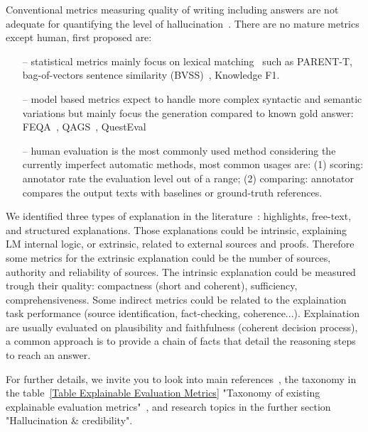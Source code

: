 \documentclass[acmsmall]{acmart}
\begin{document}
Conventional metrics measuring quality of writing including answers are not adequate for quantifying the level of hallucination~\citep{jiSurveyHallucinationNatural2022}. There are no mature metrics except human, first proposed are:
\begin{itemize}
    \item[--] statistical metrics mainly focus on lexical matching~\citep{jiSurveyHallucinationNatural2022} such as PARENT-T, bag-of-vectors sentence similarity (BVSS)~\citep{martindaleIdentifyingFluentlyInadequate2019}, Knowledge F1.
    \item[--] model based metrics expect to handle more complex syntactic and semantic variations but mainly focus the generation compared to known gold answer:  FEQA~\citep{durmusFEQAQuestionAnswering2020}, QAGS~\citep{wangAskingAnsweringQuestions2020}, QuestEval~\citep{scialomQuestEvalSummarizationAsks2021} 
    \item[--] human evaluation is the most commonly used method considering the currently imperfect automatic methods, most common usages are: (1) scoring: annotator rate the evaluation level out of a range; (2) comparing: annotator compares the output texts with baselines or ground-truth references.
\end{itemize}

We identified three types of explanation in the literature~\citep{wiegreffeTeachMeExplain2021}: highlights, free-text, and structured explanations. Those explanations could be intrinsic, explaining LM internal logic, or extrinsic, related to external sources and proofs. Therefore some metrics for the extrinsic explanation could be the number of sources, authority and reliability of sources. The intrinsic explanation could be measured trough their quality: compactness (short and coherent), sufficiency, comprehensiveness. Some indirect metrics could be related to the explaination task performance (source identification, fact-checking, coherence...). Explaination are usually evaluated on plausibility and faithfulness (coherent decision process), a common approach is to provide a chain of facts that detail the reasoning steps to reach an answer.

For further details, we invite you to look into main references~\citep{wiegreffeTeachMeExplain2021, leiterExplainableEvaluationMetrics2022, jiSurveyHallucinationNatural2022, linTruthfulQAMeasuringHow2022}, the taxonomy in the table~\ref{Table Explainable Evaluation Metrics} "Taxonomy of existing explainable evaluation metrics"~\citep{leiterExplainableEvaluationMetrics2022}, and research topics in the further section "Hallucination \& credibility".
\end{document}
